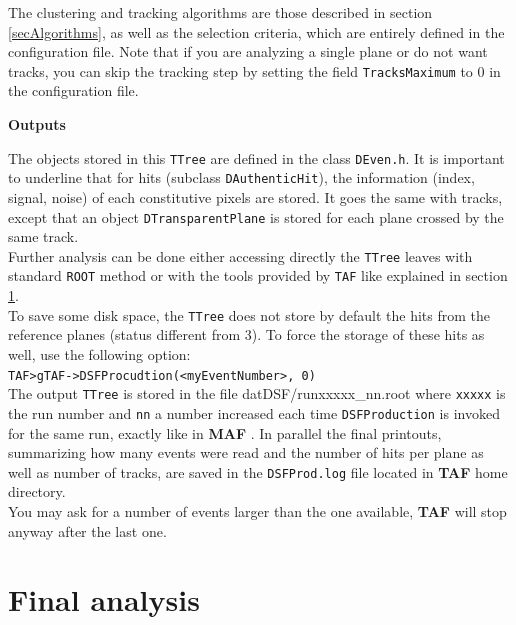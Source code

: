 \documentclass[a4paper, 12pt, twoside]{article}
\newcommand{\TAF}{{\bf TAF }}
\newcommand{\MAF}{{\bf MAF }}
\begin{document}
\noindent
The clustering and tracking algorithms are those described in section \ref{secAlgorithms}, as well as the selection criteria, which are entirely defined in the configuration file. Note that if you are analyzing a single plane or do not want tracks, you can skip the tracking step by setting the field {\tt TracksMaximum} to $0$ in the configuration file.

\vspace{0.8 cm}

\noindent
{\bf Outputs}

\noindent
The objects stored in this {\tt TTree} are defined in the class {\tt DEven.h}. It is important to underline that for hits (subclass {\tt DAuthenticHit}), the information (index, signal, noise) of each constitutive pixels are stored. It goes the same with tracks, except that an object {\tt DTransparentPlane} is stored for each plane crossed by the same track.\\
Further analysis can be done either accessing directly the {\tt TTree} leaves with standard {\tt ROOT} method or with the tools provided by {\tt TAF} like explained in section \ref{secAnalysis}.\\
To save some disk space, the {\tt TTree} does not store by default the hits from the reference planes (status different from 3). To force the storage of these hits as well, use the following option:\\
{\tt TAF>gTAF->DSFProcudtion(<myEventNumber>, 0)}\\

\noindent
The output {\tt TTree} is stored in the file {datDSF/runxxxxx\_nn.root} where {\tt xxxxx} is the run number and {\tt nn} a number increased each time {\tt DSFProduction} is invoked for the same run, exactly like in \MAF. In parallel the final printouts, summarizing how many events were read and the number of hits per plane as well as number of tracks, are saved in the {\tt DSFProd.log} file located in \TAF home directory.\\
You may ask for a number of events larger than the one available, \TAF will stop anyway after the last one.\\


\vspace{2cm}

\section{Final analysis}
\label{secAnalysis}
\end{document}
